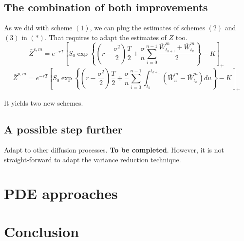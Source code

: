\documentclass{article}
\begin{document}
\subsection{The combination of both improvements}

As we did with scheme $(1)$, we can plug the estimates of schemes $(2)$ and $(3)$ in $(\ast)$. That requires
to adapt the estimates of $Z$ too.
\begin{equation}
	\bar Z^{e, m} = e^{-rT} \left[ S_0 \exp \left\{ \left( r - \frac{\sigma^2}{2} \right) \frac{T}{2} +
		\frac{\sigma}{n} \sum_{i=0}^{n-1} \frac{\bar W_{t_{k+1}}^m + \bar W_{t_k}^m}{2} \right\} - K \right]_+
	\tag{$ii$}
\end{equation}
\begin{equation}
	\bar Z^{p, m} = e^{-rT} \left[ S_0 \exp \left\{ \left( r - \frac{\sigma^2}{2} \right) \frac{T}{2} +
		\frac{\sigma}{n} \sum_{i=0}^{n-1}
		\int_{t_k}^{t_{k+1}} \left( \bar W_u^m - \bar W_{t_k}^m \right) du
		\right\} - K \right]_+
	\tag{$iii$}
\end{equation}

It yields two new schemes.

\subsection{A possible step further}

Adapt to other diffusion processes. \textbf{To be completed}. However, it is not straight-forward to adapt the
variance reduction technique.

\section{PDE approaches}

\section*{Conclusion}


{}

\end{document}
